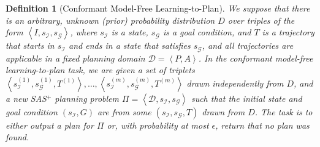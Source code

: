 \documentclass{article}
\newtheorem{definition}{Definition}
\newcommand{\tuple}[1]{\ensuremath{\left \langle #1 \right \rangle }}
\newcommand{\SAS}{SAS$^+$}
\begin{document}
	\begin{definition}[Conformant Model-Free Learning-to-Plan] We suppose that there is an arbitrary, unknown (prior) probability distribution $D$ over triples of the form $\tuple{I,s_\mathcal{I}, s_\mathcal{G}}$, where $s_\mathcal{I}$ is a state, $s_\mathcal{G}$ is a goal condition, and $T$ is a trajectory that starts in $s_\mathcal{I}$ and ends in a state that satisfies $s_\mathcal{G}$, 
		and all trajectories are applicable in a fixed planning domain $\mathcal{D}=\tuple{P,A}$. 
		In the conformant model-free learning-to-plan task, we are given a set of triplets $\tuple{s_\mathcal{I}^{(1)},s_\mathcal{G}^{(1)},T^{(1)}},\ldots,\tuple{s_\mathcal{I}^{(m)},s_\mathcal{G}^{(m)},T^{(m)}}$ drawn independently from $D$, 
		and a new \SAS{} planning problem $\Pi=\tuple{\mathcal{D}, s_\mathcal{I}, s_\mathcal{G}}$  
		such that the initial state and goal condition $(s_\mathcal{I},G)$ are from some $(s_\mathcal{I},s_\mathcal{G},T)$ drawn from $D$. 
		The task is to either output a plan for $\Pi$ or, with probability at most $\epsilon$, return that no plan was found.
		\label{def:learning-to-plan}
	\end{definition}
	
	
	
\end{document}

